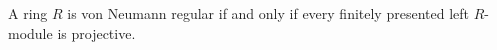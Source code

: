 A ring $R$ is von Neumann regular if and only if every finitely presented left $R$-module is projective.
